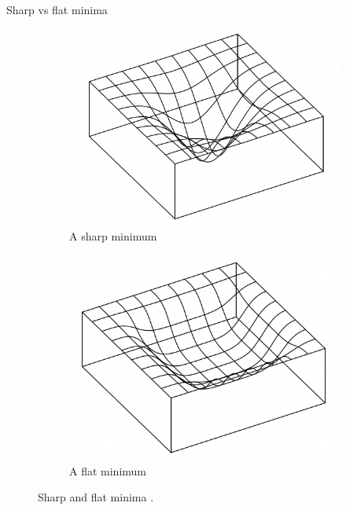 \documentclass{beamer}
\begin{document}
\begin{frame}{Sharp vs flat minima}
    \begin{figure}
        \centering
        \begin{subfigure}[b]{0.4\textwidth}
            \centering
            \includegraphics[width=\textwidth]{sharp_minimum}
            \caption{A sharp minimum}
            \label{fig:sharp_minimum}
        \end{subfigure}
        \begin{subfigure}[b]{0.4\textwidth}
            \centering
            \includegraphics[width=\textwidth]{flat_minimum}
            \caption{A flat minimum}
            \label{fig:flat_minimum}
        \end{subfigure}
        \caption{Sharp and flat minima \cite{pml2Book}.}
        \label{fig:sharp_and_flat_minima}
    \end{figure}
\end{frame}
\end{document}
